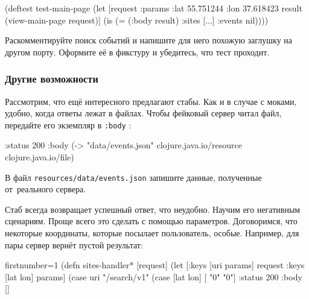 \begin{english}
  \begin{clojure}
(deftest test-main-page
  (let [request {:params {:lat 55.751244
                          :lon 37.618423}}
        result (view-main-page request)]
    (is (= (:body result) {:sites [...] :events nil}))))
  \end{clojure}
\end{english}

\fi

Раскомментируйте поиск событий и напишите для него похожую заглушку на другом
порту. Оформите её в фикстуру и убедитесь, что тест проходит.

\subsubsection*{Другие возможности}

Рассмотрим, что ещё интересного предлагают стабы. Как и в случае с моками,
удобно, когда ответы лежат в файлах. Чтобы фейковый сервер читал файл, передайте
его экземпляр в \verb|:body| :


\begin{english}
  \begin{clojure}
{:status 200
 :body (-> "data/events.json"
           clojure.java.io/resource
           clojure.java.io/file)}
  \end{clojure}
\end{english}

\noindent
В файл \verb|resources/data/events.json| запишите данные, полученные
от~реального сервера.


Стаб всегда возвращает успешный ответ, что неудобно. Научим его негативным
сценариям. Проще всего это сделать с помощью параметров. Договоримся, что
некоторые координаты, которые посылает пользователь, особые. Например, для пары
 сервер вернёт пустой результат:

\begin{english}
  \begin{clojure/lines*}{firstnumber=1}
(defn sites-handler* [request]
  (let [{:keys [uri params]} request
        {:keys [lat lon]} params]
    (case uri
      "/search/v1"
      (case [lat lon]
        [ "0"  "0"]
        {:status 200 :body []}
  \end{clojure/lines*}
\end{english}

